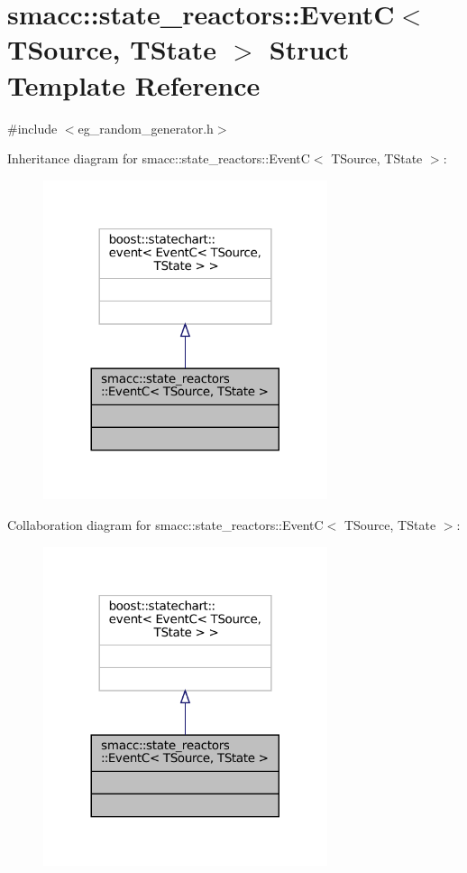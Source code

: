 \hypertarget{structsmacc_1_1state__reactors_1_1EventC}{}\section{smacc\+:\+:state\+\_\+reactors\+:\+:EventC$<$ T\+Source, T\+State $>$ Struct Template Reference}
\label{structsmacc_1_1state__reactors_1_1EventC}


{\ttfamily \#include $<$eg\+\_\+random\+\_\+generator.\+h$>$}



Inheritance diagram for smacc\+:\+:state\+\_\+reactors\+:\+:EventC$<$ T\+Source, T\+State $>$\+:
\nopagebreak
\begin{figure}[H]
\begin{center}
\leavevmode
\includegraphics[width=236pt]{structsmacc_1_1state__reactors_1_1EventC__inherit__graph}
\end{center}
\end{figure}


Collaboration diagram for smacc\+:\+:state\+\_\+reactors\+:\+:EventC$<$ T\+Source, T\+State $>$\+:
\nopagebreak
\begin{figure}[H]
\begin{center}
\leavevmode
\includegraphics[width=236pt]{structsmacc_1_1state__reactors_1_1EventC__coll__graph}
\end{center}
\end{figure}


